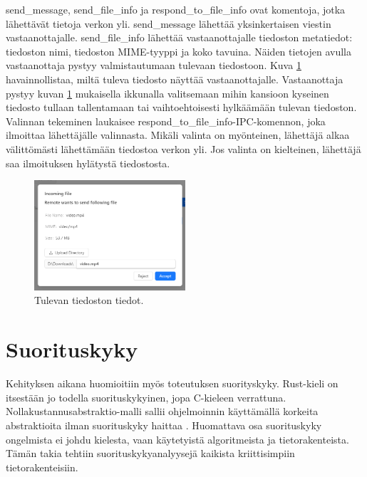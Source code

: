 \documentclass[a4paper,12pt]{article}
\begin{document}
    send\_message, send\_file\_info ja respond\_to\_file\_info ovat komentoja, jotka lähettävät tietoja verkon yli. send\_message lähettää yksinkertaisen viestin vastaanottajalle.
    send\_file\_info lähettää vastaanottajalle tiedoston metatiedot: tiedoston nimi, tiedoston MIME-tyyppi ja koko tavuina. Näiden tietojen avulla vastaanottaja pystyy valmistautumaan tulevaan tiedostoon. Kuva \ref{fig:incoming_file} havainnollistaa, miltä tuleva tiedosto näyttää vastaanottajalle. Vastaanottaja pystyy kuvan \ref{fig:incoming_file} mukaisella ikkunalla valitsemaan mihin kansioon kyseinen tiedosto tullaan tallentamaan tai vaihtoehtoisesti hylkäämään tulevan tiedoston. Valinnan tekeminen laukaisee respond\_to\_file\_info-IPC-komennon, joka ilmoittaa lähettäjälle valinnasta.
    Mikäli valinta on myönteinen, lähettäjä alkaa välittömästi lähettämään tiedostoa verkon yli. Jos valinta on kielteinen, lähettäjä saa ilmoituksen hylätystä tiedostosta.

    \begin{figure}[h!]
        \centering
        \includegraphics[width=0.5\textwidth]{doc/latex/src/images/incoming_file.png}
        \caption{Tulevan tiedoston tiedot.}
        \label{fig:incoming_file}
    \end{figure}

    \section{Suorituskyky}\label{sec:suorityskyky}
    Kehityksen aikana huomioitiin myös toteutuksen suorityskyky. Rust-kieli on itsestään jo todella suorituskykyinen, jopa C-kieleen verrattuna. Nollakustannusabstraktio-malli sallii ohjelmoinnin käyttämällä korkeita abstraktioita ilman suorituskyky haittaa \cite{Codex2023UnderstandingAbstractions}. Huomattava osa suorituskyky ongelmista ei johdu kielesta, vaan käytetyistä algoritmeista ja tietorakenteista. Tämän takia tehtiin suorituskykyanalyysejä kaikista kriittisimpiin tietorakenteisiin.   
\end{document}
